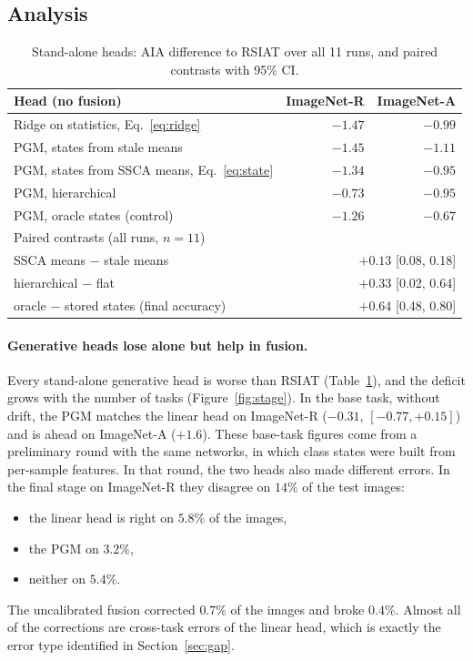 \subsection{Analysis}
\label{sec:analysis}

\begin{table}[t]
\centering
\caption{Stand-alone heads: AIA difference to RSIAT over all 11 runs, and
paired contrasts with 95\% CI.}
\label{tab:heads}
\setlength{\tabcolsep}{5pt}
\begin{tabular}{lrr}
\toprule
Head (no fusion) & ImageNet-R & ImageNet-A \\
\midrule
Ridge on statistics, Eq.~\eqref{eq:ridge} & $-1.47$ & $-0.99$ \\
PGM, states from stale means & $-1.45$ & $-1.11$ \\
PGM, states from SSCA means, Eq.~\eqref{eq:state} & $-1.34$ & $-0.95$ \\
PGM, hierarchical & $-0.73$ & $-0.95$ \\
PGM, oracle states (control) & $-1.26$ & $-0.67$ \\
\midrule
\multicolumn{3}{l}{Paired contrasts (all runs, $n=11$)}\\
\quad SSCA means $-$ stale means & \multicolumn{2}{r}{$+0.13$ [0.08, 0.18]} \\
\quad hierarchical $-$ flat & \multicolumn{2}{r}{$+0.33$ [0.02, 0.64]} \\
\quad oracle $-$ stored states (final accuracy) & \multicolumn{2}{r}{$+0.64$ [0.48, 0.80]} \\
\bottomrule
\end{tabular}
\end{table}

\paragraph{Generative heads lose alone but help in fusion.}
Every stand-alone generative head is worse than RSIAT (Table~\ref{tab:heads}),
and the deficit grows with the number of tasks (Figure~\ref{fig:stage}). In
the base task, without drift, the PGM matches the linear head on
ImageNet-R ($-0.31$, $[-0.77,+0.15]$) and is ahead on ImageNet-A ($+1.6$).
These base-task figures come from a preliminary round with the same
networks, in which class states were built from per-sample features.
In that round, the two heads also made different errors. In the final stage
on ImageNet-R they disagree on $14\%$ of the test images:
\begin{itemize}
  \item the linear head is right on $5.8\%$ of the images,
  \item the PGM on $3.2\%$,
  \item neither on $5.4\%$.
\end{itemize}
The uncalibrated fusion corrected $0.7\%$ of the images and broke $0.4\%$.
Almost all of the corrections are cross-task errors of the linear head,
which is exactly the error type identified in Section~\ref{sec:gap}.

